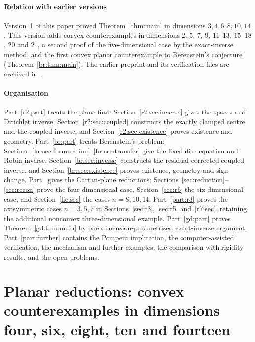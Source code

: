 \documentclass[11pt]{amsart}
\theoremstyle{definition}
\theoremstyle{remark}
\numberwithin{equation}{section}
\begin{document}
\subsection*{Relation with earlier versions}
Version~1 of this paper proved Theorem~\ref{thm:main} in dimensions $3,4,6,8,10,14$. This version adds convex counterexamples in dimensions $2$, $5$, $7$, $9$, $11$--$13$, $15$--$18$, $20$ and $21$, a second proof of the five-dimensional case by the exact-inverse method, and the first convex planar counterexample to Berenstein's conjecture (Theorem~\ref{br:thm:main}). The earlier preprint and its verification files are archived in~\cite{Guo26}.

\subsection*{Organisation}
Part~\ref{r2:part} treats the plane first: Section~\ref{r2:sec:inverse} gives the spaces and Dirichlet inverse, Section~\ref{r2:sec:coupled} constructs the exactly clamped centre and the coupled inverse, and Section~\ref{r2:sec:existence} proves existence and geometry. Part~\ref{br:part} treats Berenstein's problem: Sections~\ref{br:sec:formulation}--\ref{br:sec:transfer} give the fixed-disc equation and Robin inverse, Section~\ref{br:sec:inverse} constructs the residual-corrected coupled inverse, and Section~\ref{br:sec:existence} proves existence, geometry and sign change. Part~\ref{part:planar} gives the Cartan-plane reductions: Sections~\ref{sec:reduction}--\ref{sec:recon} prove the four-dimensional case, Section~\ref{sec:r6} the six-dimensional case, and Section~\ref{lie:sec} the cases $n=8,10,14$. Part~\ref{part:r3} proves the axisymmetric cases $n=3,5,7$ in Sections~\ref{sec:r3}, \ref{sec:r5} and~\ref{r7:sec}, retaining the additional nonconvex three-dimensional example. Part~\ref{gd:part} proves Theorem~\ref{gd:thm:main} by one dimension-parametrised exact-inverse argument. Part~\ref{part:further} contains the Pompeiu implication, the computer-assisted verification, the mechanism and further examples, the comparison with rigidity results, and the open problems.






\part{Planar reductions: convex counterexamples in dimensions four, six, eight, ten and fourteen}\label{part:planar}
\end{document}
